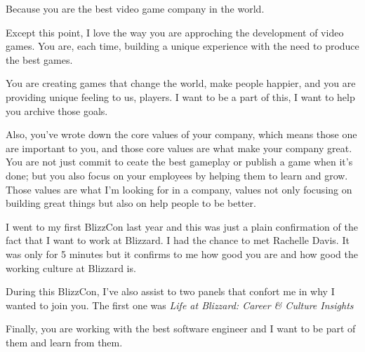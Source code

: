 
Because you are the best video game company in the world. 

Except this point, I love the way you are approching the development of video games. You are, each time, building a unique experience with the need to produce the best games.

You are creating games that change the world, make people happier, and you are providing unique feeling to us, players. I want to be a part of this, I want to help you archive those goals.

Also, you've wrote down the core values of your company, which means those one are important to you, and those core values are what make your company great. You are not just commit to ceate the best gameplay or publish a game when it's done; but you also focus on your employees by helping them to learn and grow. Those values are what I'm looking for in a company, values not only focusing on building great things but also on help people to be better.

I went to my first BlizzCon last year and this was just a plain confirmation of the fact that I want to work at Blizzard. I had the chance to met Rachelle Davis. It was only for 5 minutes but it confirms to me how good you are and how good the working culture at Blizzard is. 

During this BlizzCon, I've also assist to two panels that confort me in why I wanted to join you. The first one was \emph{Life at Blizzard: Career & Culture Insights} 

Finally, you are working with the best software engineer and I want to be part of them and learn from them.